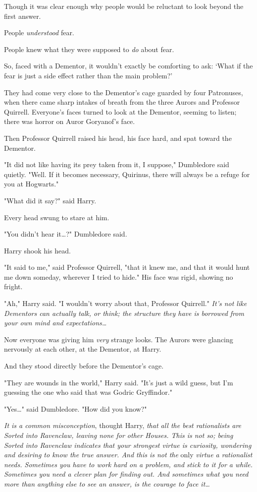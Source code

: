 Though it was clear enough why people would be reluctant to look beyond the
first answer.

People \emph{understood} fear.

People knew what they were supposed to \emph{do} about fear.

So, faced with a Dementor, it wouldn't exactly be comforting to ask: `What if
the fear is just a side effect rather than the main problem?'

They had come very close to the Dementor's cage guarded by four Patronuses,
when there came sharp intakes of breath from the three Aurors and Professor
Quirrell. Everyone's faces turned to look at the Dementor, seeming to listen;
there was horror on Auror Goryanof's face.

Then Professor Quirrell raised his head, his face hard, and spat toward the
Dementor.

"It did not like having its prey taken from it, I suppose," Dumbledore said
quietly. "Well. If it becomes necessary, Quirinus, there will always be a
refuge for you at Hogwarts."

"What did it say?" said Harry.

Every head swung to stare at him.

"You didn't hear it{\ldots}?" Dumbledore said.

Harry shook his head.

"It said to me," said Professor Quirrell, "that it knew me, and that it would
hunt me down someday, wherever I tried to hide." His face was rigid, showing no
fright.

"Ah," Harry said. "I wouldn't worry about that, Professor Quirrell." \emph{It's
not like Dementors can actually talk, or think; the structure they have is
borrowed from your own mind and expectations{\ldots}}

Now everyone was giving him \emph{very} strange looks. The Aurors were glancing
nervously at each other, at the Dementor, at Harry.

And they stood directly before the Dementor's cage.

"They are wounds in the world," Harry said. "It's just a wild guess, but I'm
guessing the one who said that was Godric Gryffindor."

"Yes{\ldots}" said Dumbledore. "How did you know?"

\emph{It is a common misconception}, thought Harry, \emph{that all the best
rationalists are Sorted into Ravenclaw, leaving none for other Houses. This is
not so; being Sorted into Ravenclaw indicates that your strongest virtue is
curiosity, wondering and desiring to know the true answer. And this is not the}
only \emph{virtue a rationalist needs. Sometimes you have to work hard on a
problem, and stick to it for a while. Sometimes you need a clever plan for
finding out. And sometimes what you need more than anything else to see an
answer, is the courage to face it{\ldots}}

